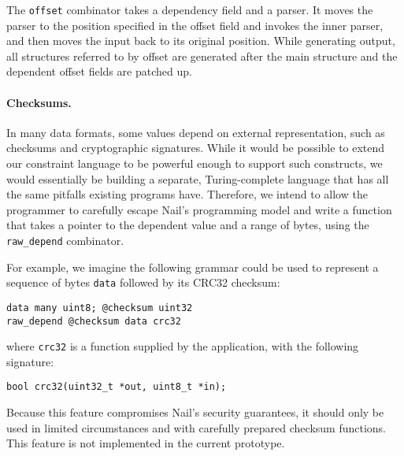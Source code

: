 The \texttt{offset} combinator takes a dependency field and a parser. It
moves the parser to the position specified in the offset field and
invokes the inner parser, and then moves the input back to its original
position.  While generating output, all structures referred to by offset
are generated after the main structure and the dependent offset fields
are patched up.

\paragraph{Checksums.}

In many data formats, some values depend on external representation,
such as checksums and cryptographic signatures.  While it would be
possible to extend our constraint language to be powerful enough to
support such constructs, we would essentially be building a separate,
Turing-complete language that has all the same pitfalls existing programs
have.  Therefore, we intend to allow the programmer to carefully escape
Nail's programming model and write a function that takes a pointer to
the dependent value and a range of bytes, using the \texttt{raw_depend}
combinator.

For example, we imagine the following grammar could be used to represent
a sequence of bytes \texttt{data} followed by its CRC32 checksum:

\begin{verbatim}
data many uint8; @checksum uint32
raw_depend @checksum data crc32
\end{verbatim}

\noindent
where \texttt{crc32} is a function supplied by the application, with
the following signature:

\begin{verbatim}
bool crc32(uint32_t *out, uint8_t *in);
\end{verbatim}

Because this feature compromises Nail's security guarantees, it should
only be used in limited circumstances and with carefully prepared checksum
functions.  This feature is not implemented in the current prototype.

